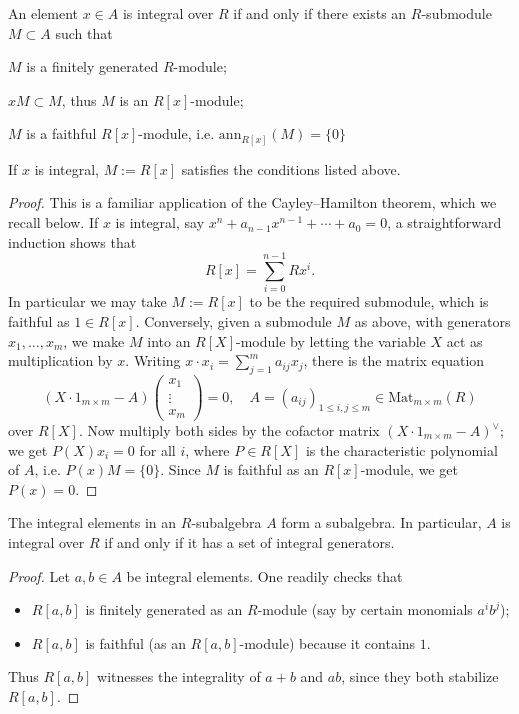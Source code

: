 \begin{proposition}
	An element $x \in A$ is integral over $R$ if and only if there exists an $R$-submodule $M \subset A$ such that
	\begin{compactitem}
		\item $M$ is a finitely generated $R$-module;
		\item $xM \subset M$, thus $M$ is an $R[x]$-module;
		\item $M$ is a faithful $R[x]$-module, i.e. $\mathrm{ann}_{R[x]}(M) = \{0\}$
	\end{compactitem}
	If $x$ is integral, $M := R[x]$ satisfies the conditions listed above.
\end{proposition}
\begin{proof}
	This is a familiar application of the Cayley--Hamilton theorem, which we recall below. If $x$ is integral, say $x^n + a_{n-1} x^{n-1} + \cdots + a_0 = 0$, a straightforward induction shows that
	\[ R[x] = \sum_{i=0}^{n-1} Rx^i. \]
	In particular we may take $M := R[x]$ to be the required submodule, which is faithful as $1 \in R[x]$. Conversely, given a submodule $M$ as above, with generators $x_1, \ldots, x_m$, we make $M$ into an $R[X]$-module by letting the variable $X$ act as multiplication by $x$. Writing $x \cdot x_i = \sum_{j=1}^m a_{ij} x_j$, there is the matrix equation
	\[ (X \cdot 1_{m \times m} - A) \begin{pmatrix} x_1 \\ \vdots \\ x_m \end{pmatrix} = 0, \quad A = (a_{ij})_{1 \leq i,j \leq m} \in \text{Mat}_{m \times m}(R) \]
	over $R[X]$. Now multiply both sides by the cofactor matrix $(X \cdot 1_{m \times m} - A)^\vee$; we get $P(X) x_i = 0$ for all $i$, where $P \in R[X]$ is the characteristic polynomial of $A$, i.e. $P(x)M = \{0\}$. Since $M$ is faithful as an $R[x]$-module, we get $P(x)=0$.
\end{proof}

\begin{corollary}
	The integral elements in an $R$-subalgebra $A$ form a subalgebra. In particular, $A$ is integral over $R$ if and only if it has a set of integral generators.
\end{corollary}
\begin{proof}
	Let $a, b \in A$ be integral elements. One readily checks that
	\begin{itemize}
		\item $R[a,b]$ is finitely generated as an $R$-module (say by certain monomials $a^i b^j$);
		\item $R[a,b]$ is faithful (as an $R[a,b]$-module) because it contains $1$.
	\end{itemize}
	Thus $R[a,b]$ witnesses the integrality of $a+b$ and $ab$, since they both stabilize $R[a,b]$.
\end{proof}

